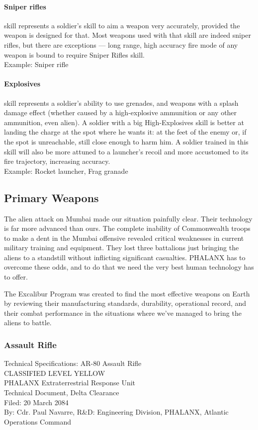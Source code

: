 \paragraph*{Sniper rifles}
 skill represents a soldier's skill to aim a weapon very accurately, provided the weapon is designed for that. Most weapons used with that skill are indeed sniper rifles, but there are exceptions --- long range, high accuracy fire mode of any weapon is bound to require Sniper Rifles skill.\\
Example: Sniper rifle
\paragraph*{Explosives}
 skill represents a soldier's ability to use grenades, and weapons with a splash damage effect (whether caused by a high-explosive ammunition or any other ammunition, even alien). A soldier with a big High-Explosives skill is better at landing the charge at the spot where he wants it: at the feet of the enemy or, if the spot is unreachable, still close enough to harm him. A soldier trained in this skill will also be more attuned to a launcher's recoil and more accustomed to its fire trajectory, increasing accuracy.\\
Example: Rocket launcher, Frag granade

\newpage

\subsection{Primary Weapons}
The alien attack on Mumbai made our situation painfully clear. Their technology is far more advanced than ours. The complete inability of Commonwealth troops to make a dent in the Mumbai offensive revealed critical weaknesses in current military training and equipment. They lost three battalions just bringing the aliens to a standstill without inflicting significant casualties. PHALANX has to overcome these odds, and to do that we need the very best human technology has to offer.

The Excalibur Program was created to find the most effective weapons on Earth by reviewing their manufacturing standards, durability, operational record, and their combat performance in the situations where we've managed to bring the aliens to battle.

\subsubsection*{Assault Rifle}
Technical Specifications: AR-80 Assault Rifle\\
CLASSIFIED LEVEL YELLOW\\
PHALANX Extraterrestrial Response Unit\\
Technical Document, Delta Clearance\\
Filed: 20 March 2084\\
By: Cdr. Paul Navarre, R&D: Engineering Division, PHALANX, Atlantic Operations Command\\
